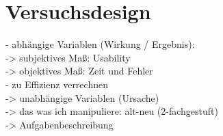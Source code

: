 \section{Versuchsdesign}
-	abhängige Variablen (Wirkung / Ergebnis):\\
->	subjektives Maß: Usability\\
->	objektives Maß: Zeit und Fehler\\
- zu Effizienz verrechnen\\
-> unabhängige Variablen (Ursache)\\
-> das was ich manipuliere: alt-neu (2-fachgestuft)\\
->	Aufgabenbeschreibung
